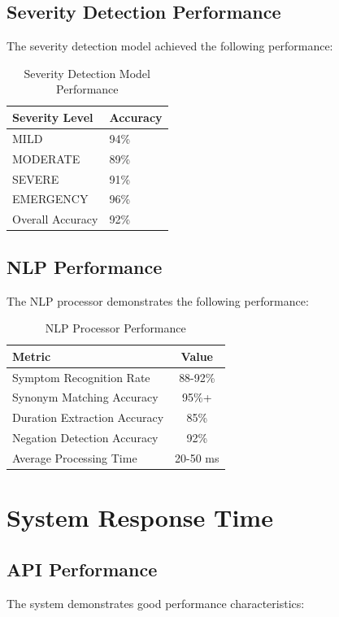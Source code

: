 \documentclass[12pt,a4paper]{article}
\begin{document}
\subsection{Severity Detection Performance}
The severity detection model achieved the following performance:

\begin{table}[H]
\centering
\caption{Severity Detection Model Performance}
\label{tab:severityperformance}
\begin{tabularx}{0.6\textwidth}{|l|X|}
\hline
\textbf{Severity Level} & \textbf{Accuracy} \\
\hline
MILD & 94\% \\
\hline
MODERATE & 89\% \\
\hline
SEVERE & 91\% \\
\hline
EMERGENCY & 96\% \\
\hline
Overall Accuracy & 92\% \\
\hline
\end{tabularx}
\end{table}

\subsection{NLP Performance}
The NLP processor demonstrates the following performance:

\begin{table}[H]
\centering
\caption{NLP Processor Performance}
\label{tab:nlpperformance}
\begin{tabular}{|l|c|}
\hline
\textbf{Metric} & \textbf{Value} \\
\hline
Symptom Recognition Rate & 88-92\% \\
\hline
Synonym Matching Accuracy & 95\%+ \\
\hline
Duration Extraction Accuracy & 85\% \\
\hline
Negation Detection Accuracy & 92\% \\
\hline
Average Processing Time & 20-50 ms \\
\hline
\end{tabular}
\end{table}

\section{System Response Time}
\subsection{API Performance}
The system demonstrates good performance characteristics:
\end{document}
